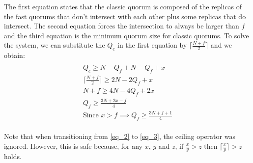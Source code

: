 The first equation states that the classic quorum is composed of the replicas of the fast quorums that don't intersect with each other plus some replicas that do intersect. The second equation forces the intersection to always be larger than $f$ and the third equation is the minimum quorum size for classic quorums. To solve the system, we can substitute the $Q_c$ in the first equation by $\lceil \frac{N+f}{2}\rceil$ and we obtain:
\begin{gather*} \\
	Q_c \geq N - Q_f + N-Q_f + x \label{eq_1} \tag{1} \\ 
	\lceil\frac{N+f}{2}\rceil \geq 2N - 2Q_f + x \label{eq_2} \tag{2} \\
	N+f \geq 4N - 4Q_f + 2x \label{eq_3} \tag{3} \\
	Q_f \geq \frac{3N+2x-f}{4} \label{eq_4} \tag{4} \\ 
	\text{Since $x > f$} \implies Q_f \geq \frac{3N+f+1}{4} \label{eq_5} \tag{5}  \\
\end{gather*}

Note that when transitioning from \eqref{eq_2} to \eqref{eq_3}, the ceiling operator was ignored. However, this is safe because, for any $x$, $y$ and $z$, if $\frac{x}{y} > z$ then $\lceil \frac{x}{y} \rceil > z$ holds.\par


